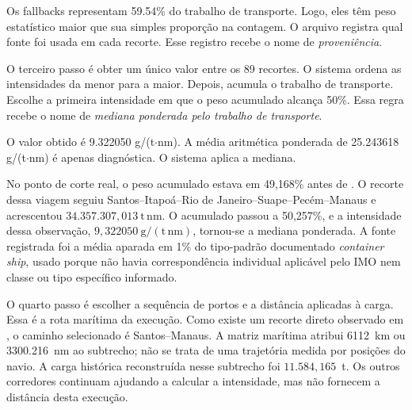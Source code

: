 Os fallbacks representam \num{59.54}\% do trabalho de transporte. Logo, eles têm peso estatístico maior que sua simples proporção na contagem. O arquivo registra qual fonte foi usada em cada recorte. Esse registro recebe o nome de \emph{proveniência}.

O terceiro passo é obter um único valor entre os 89 recortes. O sistema ordena as intensidades da menor para a maior. Depois, acumula o trabalho de transporte. Escolhe a primeira intensidade em que o peso acumulado alcança 50\%. Essa regra recebe o nome de \emph{mediana ponderada pelo trabalho de transporte}.

O valor obtido é \num{9.322050} g/(t$\cdot$nm). A média aritmética ponderada de \num{25.243618} g/(t$\cdot$nm) é apenas diagnóstica. O sistema aplica a mediana.

No ponto de corte real, o peso acumulado estava em 49,168\% antes de . O recorte dessa viagem seguiu Santos--Itapoá--Rio de Janeiro--Suape--Pecém--Manaus e acrescentou \(34.357.307{,}013~\mathrm{t\,nm}\). O acumulado passou a 50,257\%, e a intensidade dessa observação, \(9{,}322050~\mathrm{g/(t\,nm)}\), tornou-se a mediana ponderada. A fonte registrada foi a média aparada em 1\% do tipo-padrão documentado \emph{container ship}, usado porque não havia correspondência individual aplicável pelo IMO nem classe ou tipo específico informado.

O quarto passo é escolher a sequência de portos e a distância aplicadas à carga. Essa é a rota marítima da execução. Como existe um recorte direto observado em , o caminho selecionado é Santos--Manaus. A matriz marítima atribui \num{6112}~km ou \num{3300.216}~nm ao subtrecho; não se trata de uma trajetória medida por posições do navio. A carga histórica reconstruída nesse subtrecho foi \(11.584{,}165\)~t. Os outros corredores continuam ajudando a calcular a intensidade, mas não fornecem a distância desta execução.

